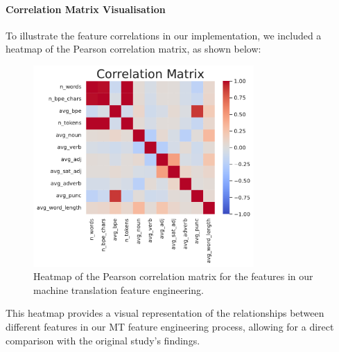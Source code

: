 \paragraph{Correlation Matrix Visualisation}
To illustrate the feature correlations in our implementation, we included a heatmap of the Pearson correlation matrix, as shown below:

\begin{figure}[h]
	\centering
	\includegraphics[width=0.75\textwidth]{figures/text_corr_matrix.pdf}
	\caption{Heatmap of the Pearson correlation matrix for the features in our machine translation feature engineering.}
	\label{fig:nlp_correlation_matrix}
\end{figure}

This heatmap provides a visual representation of the relationships between different features in our MT feature engineering process, allowing for a direct comparison with the original study's findings.



